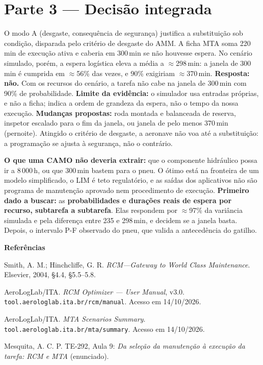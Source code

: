 \documentclass[11pt,a4paper]{article}
\begin{document}
\section*{Parte 3 --- Decisão integrada}
O modo A (desgaste, consequência de segurança) justifica a substituição sob condição, disparada pelo critério de desgaste do AMM. A ficha MTA soma 220\,min de execução ativa e caberia em 300\,min se não houvesse espera. No cenário simulado, porém, a espera logística eleva a média a $\approx$298\,min: a janela de 300\,min é cumprida em $\approx$56\% das vezes, e 90\% exigiriam $\approx$370\,min.
\textbf{Resposta: não.} Com os recursos do cenário, a tarefa não cabe na janela de 300\,min com 90\% de probabilidade.
\textbf{Limite da evidência:} o simulador usa entradas próprias, e não a ficha; indica a ordem de grandeza da espera, não o tempo da nossa execução.
\textbf{Mudanças propostas:} roda montada e balanceada de reserva, inspetor escalado para o fim da janela, ou janela de pelo menos 370\,min (pernoite).
Atingido o critério de desgaste, a aeronave não voa até a substituição: a programação se ajusta à segurança, não o contrário.

\textbf{O que uma CAMO não deveria extrair:} que o componente hidráulico possa ir a 8\,000\,h, ou que 300\,min bastem para o pneu. O ótimo está na fronteira de um modelo simplificado, o LIM é teto regulatório, e as saídas dos aplicativos não são programa de manutenção aprovado nem procedimento de execução.
\textbf{Primeiro dado a buscar:} as \textbf{probabilidades e durações reais de espera por recurso, subtarefa a subtarefa}. Elas respondem por $\approx$97\% da variância simulada e pela diferença entre 235 e 298\,min, e decidem se a janela basta. Depois, o intervalo P-F observado do pneu, que valida a antecedência do gatilho.

\vspace{3pt}\textbf{Referências}\par
[1] Smith, A. M.; Hinchcliffe, G. R. \emph{RCM---Gateway to World Class Maintenance}. Elsevier, 2004, §4.4, §5.5--5.8.\par
[2] AeroLogLab/ITA. \emph{RCM Optimizer --- User Manual}, v3.0. \texttt{tool.aerologlab.ita.br/rcm/manual}. Acesso em 14/10/2026.\par
[3] AeroLogLab/ITA. \emph{MTA Scenarios Summary}. \texttt{tool.aerologlab.ita.br/mta/summary}. Acesso em 14/10/2026.\par
[4] Mesquita, A. C. P. TE-292, Aula 9: \emph{Da seleção da manutenção à execução da tarefa: RCM e MTA} (enunciado).
\end{document}
